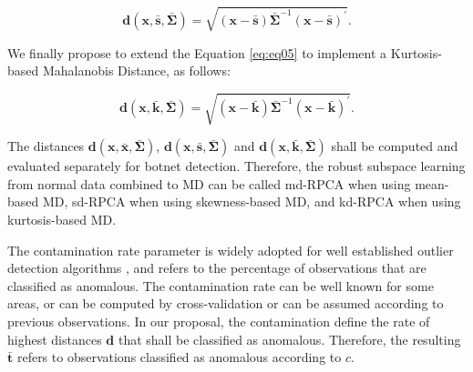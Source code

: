 \documentclass[review]{elsarticle}
\begin{document}
\begin{equation}\label{eq:eq08}
	\boldsymbol{d}(\boldsymbol{x}, \bar{\boldsymbol{s}}, \boldsymbol{\bar{\Sigma}}) = \sqrt{(\boldsymbol{x} - \bar{\boldsymbol{s}}) \boldsymbol{\bar{\Sigma}}^{-1}(\boldsymbol{x} - \bar{\boldsymbol{s}})^\prime}.
\end{equation}

We finally propose to extend the Equation \ref{eq:eq05} to implement a Kurtosis-based Mahalanobis Distance, as follows:

\begin{equation}\label{eq:eq09}
	\boldsymbol{d}(\boldsymbol{x}, \bar{\boldsymbol{k}}, \boldsymbol{\bar{\Sigma}}) = \sqrt{(\boldsymbol{x} - \bar{\boldsymbol{k}}) \boldsymbol{\bar{\Sigma}}^{-1}(\boldsymbol{x} - \bar{\boldsymbol{k}})^\prime}.
\end{equation}

The distances $\boldsymbol{d}(\boldsymbol{x},\bar{\boldsymbol{x}}, \boldsymbol{\bar{\Sigma}})$, $\boldsymbol{d}(\boldsymbol{x}, \bar{\boldsymbol{s}}, \boldsymbol{\bar{\Sigma}})$ and $\boldsymbol{d}(\boldsymbol{x}, \bar{\boldsymbol{k}}, \boldsymbol{\bar{\Sigma}})$ shall be computed and evaluated separately for botnet detection. Therefore, the robust subspace learning from normal data combined to MD can be called md-RPCA when using mean-based MD, sd-RPCA when using skewness-based MD, and kd-RPCA when using kurtosis-based MD.

The contamination rate parameter is widely adopted for well established outlier detection algorithms \cite{zhao2019pyod}, and refers to the percentage of observations that are classified as anomalous. The contamination rate can be well known for some areas, or can be computed by cross-validation or can be assumed according to previous observations. In our proposal, the contamination define the rate of highest distances $\boldsymbol{d}$ that shall be classified as anomalous. Therefore, the resulting $\boldsymbol{\bar{t}}$ refers to observations classified as anomalous according to $c$.
\end{document}

